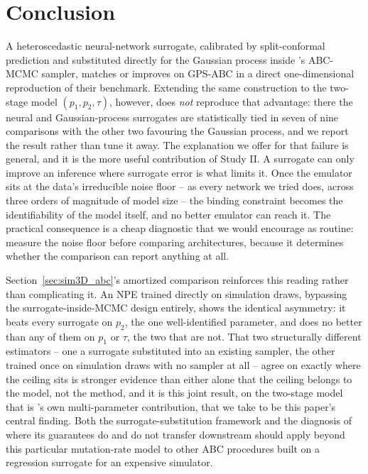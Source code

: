\documentclass[sn-basic,iicol,pdflatex]{sn-jnl}
\begin{document}
\section{Conclusion}
\label{sec:conclusion}

A heteroscedastic neural-network surrogate, calibrated by split-conformal
prediction and substituted directly for the Gaussian process inside
\citeauthor{lu2023}'s ABC-MCMC sampler, matches or improves on GPS-ABC in a
direct one-dimensional reproduction of their benchmark. Extending the same
construction to the two-stage model $(p_1,p_2,\tau)$, however, does \emph{not}
reproduce that advantage: there the neural and Gaussian-process surrogates are
statistically tied in seven of nine comparisons with the other two favouring the
Gaussian process, and we report the result rather than tune it away. The explanation we offer for that failure is general, and it is the more useful
contribution of Study II. A surrogate can only improve an inference where
surrogate error is what limits it. Once the emulator sits at the data's
irreducible noise floor -- as every network we tried does, across three orders
of magnitude of model size -- the binding constraint becomes the identifiability
of the model itself, and no better emulator can reach it. The practical
consequence is a cheap diagnostic that we would encourage as routine: measure
the noise floor before comparing architectures, because it determines whether
the comparison can report anything at all.

Section~\ref{sec:sim3D_abc}'s amortized comparison reinforces this reading
rather than complicating it. An NPE trained directly on simulation draws,
bypassing the surrogate-inside-MCMC design entirely, shows the identical
asymmetry: it beats every surrogate on $p_2$, the one well-identified
parameter, and does no better than any of them on $p_1$ or $\tau$, the two
that are not. That two structurally different estimators -- one a
surrogate substituted into an existing sampler, the other trained once on
simulation draws with no sampler at all -- agree on exactly where the
ceiling sits is stronger evidence than either alone that the ceiling
belongs to the model, not the method, and it is this joint result, on the
two-stage model that is \citeauthor{lu2023}'s own multi-parameter
contribution, that we take to be this paper's central finding.
Both the surrogate-substitution framework and the diagnosis of where its
guarantees do and do not transfer downstream should apply beyond this
particular mutation-rate model to other ABC procedures built on a
regression surrogate for an expensive simulator.
\end{document}
